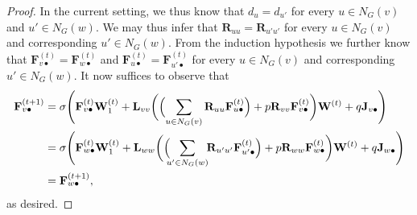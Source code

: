 \begin{proof}
In the current setting, we thus know that $d_{u}=d_{u'}$ for every $u\in N_G(v)$ and $u'\in N_G(w)$. We may thus infer that $\mathbf{R}_{uu}=\mathbf{R}_{u'u'}$ for every $u\in N_G(v)$ and corresponding $u'\in N_G(w)$.
 From the induction hypothesis we further know that 
 $\mathbf{F}^{(t)}_{v\bullet}=\mathbf{F}^{(t)}_{w\bullet}$ and 
 $\mathbf{F}^{(t)}_{u\bullet}=\mathbf{F}^{(t)}_{u'\bullet}$ for  every $u\in N_G(v)$ and corresponding $u'\in N_G(w)$.
%
%
  It now suffices to observe that
  \begin{align*}
	  \mathbf{F}^{(t+1)}_{v\bullet}&=\sigma\Biggl(\mathbf{F}^{(t)}_{v\bullet}\mathbf{W}_1^{(t)}+\mathbf{L}_{vv}\biggl(\Bigl(\sum_{u\in N_G(v)} \mathbf{R}_{uu}\mathbf{F}^{(t)}_{u\bullet}\Bigr)+p\mathbf{R}_{vv}\mathbf{F}^{(t)}_{v\bullet}\biggr)\mathbf{W}^{(t)}+ q\mathbf{J}_{v\bullet}\Biggr)\\
	 & =\sigma\Biggl(\mathbf{F}^{(t)}_{w\bullet}\mathbf{W}_1^{(t)}+\mathbf{L}_{ww}\biggl(\Bigl(\!\!\sum_{u'\in N_G(w)}\!\! \mathbf{R}_{u'u'}\mathbf{F}^{(t)}_{u'\bullet}\Bigr)+p\mathbf{R}_{ww}\mathbf{F}^{(t)}_{w\bullet}\biggr)\mathbf{W}^{(t)}+ q\mathbf{J}_{w\bullet}\Biggr)\\
	  &=\mathbf{F}^{(t+1)}_{w\bullet},
\end{align*}
as desired.
\end{proof}

